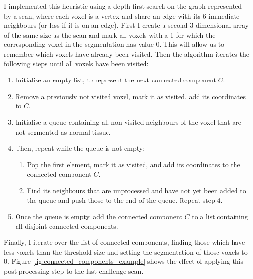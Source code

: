 \documentclass[12pt,a4paper,twoside,openright]{report}
\begin{document}
I implemented this heuristic using a depth first search on the graph represented by a scan, where each voxel is a vertex and share an edge with its 6 immediate neighbours (or less if it is on an edge). First I create a second 3-dimensional array of the same size as the scan and mark all voxels with a 1 for which the corresponding voxel in the segmentation has value 0. This will allow us to remember which voxels have already been visited. Then the algorithm iterates the following steps until all voxels have been visited:
\begin{enumerate}
	\item Initialise an empty list, to represent the next connected component $C$.
	\item Remove a previously not visited voxel, mark it as visited, add its coordinates to $C$.
	\item Initialise a queue containing all non visited neighbours of the voxel that are not segmented as normal tissue.
	\item Then, repeat while the queue is not empty:
	\begin{enumerate}
		\item Pop the first element, mark it as visited, and add its coordinates to the connected component $C$.
		\item Find its neighbours that are unprocessed and have not yet been added to the queue and push those to the end of the queue. Repeat step 4.
	\end{enumerate}
	\item Once the queue is empty, add the connected component $C$ to a list containing all disjoint connected components.
\end{enumerate}
Finally, I iterate over the list of connected components, finding those which have less voxels than the threshold size and setting the segmentation of those voxels to 0. Figure \ref{fig:connected_components_example} shows the effect of applying this post-processing step to the last challenge scan.
\end{document}
